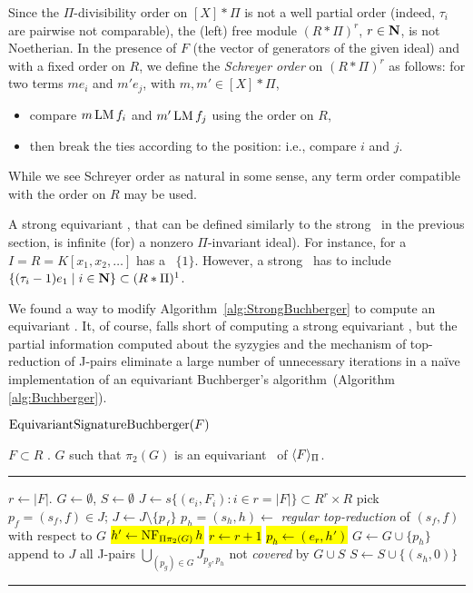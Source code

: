 Since the $\Pi$-divisibility order on $[X]*\Pi$ is not a well partial order (indeed, $\tau_i$ are pairwise not comparable), the (left) free module $(R*\Pi)^r$, $r\in\mathbf N$, is not Noetherian.  
In the presence of $F$ (the vector of generators of the given ideal) and with a fixed order on $R$, we define the \emph{Schreyer order} on $(R*\Pi)^r$ as follows: for two terms $me_i$ and $m'e_j$, with $m,m'\in [X]*\Pi$,
\begin{itemize}
\item compare $m\operatorname{LM} f_i$ and $m'\operatorname{LM} f_j$ using the order on $R$,
\item then break the ties according to the position: i.e., compare $i$ and $j$.
\end{itemize}
While we see Schreyer order as natural in some sense, any term order compatible with the order on $R$ may be used. %

A strong equivariant \GB, that can be defined similarly to the strong \GB\ in the previous section, is infinite (for) a nonzero $\Pi$-invariant ideal). 
For instance, for a $I = R = K[x_1,x_2,\ldots]$ has a \GB\ $\{1\}$.
However, a strong \GB\ has to include $\{(\tau_i-1)e_1 \mid i\in\mathbf N \} \subset (R*\Pi)^1$. 

We found a way to modify Algorithm~\ref{alg:StrongBuchberger} to compute an equivariant \GB.  It, of course, falls short of computing a strong equivariant \GB, but the partial information computed about the syzygies and the mechanism of top-reduction of J-pairs eliminate a large number of unnecessary iterations in a na\"ive implementation of an equivariant Buchberger's algorithm~(Algorithm \ref{alg:Buchberger}).

\begin{algorithm}\label{alg:egb-signature}
$\operatorname{EquivariantSignatureBuchberger}(F)$

\begin{algorithmic}[1]
\REQUIRE $F\subset R$ .
\ENSURE $G$ such that $\pi_2(G)$ is an equivariant \GB\ of $\langle F \rangle_\Pi$.
\smallskip \hrule \smallskip
\STATE $r\gets |F|$.
\STATE $G\gets \emptyset$, $S\gets \emptyset$ 
\STATE $J\gets s\{(e_i,F_i):i\in r=|F|\} \subset R^r\times R$ 
	\STATE pick $p_f = (s_f,f) \in J$; $J\gets J\setminus\{p_f\}$
	\STATE $p_h=(s_h,h) \gets$ {\em regular top-reduction} of $(s_f,f)$ with respect to $G$
		\STATE \hl{$h' \gets\operatorname{NF}_{\Pi\pi_2(G)} h$}
				\STATE \hl{$r\gets r+1$}
				\STATE \hl{$p_h \gets (e_r,h')$}
			\ENDIF
			\STATE $G\gets G\cup \{p_h\}$
			\STATE append to $J$ all J-pairs $\bigcup_{(p_g)\in G}J_{p_g,p_h}$ not {\em covered} by $G \cup S$ 
		\ENDIF
        \ELSE 
                \STATE $S\gets S\cup\{(s_h,0)\}$
	\ENDIF
\ENDWHILE
\smallskip \hrule \smallskip
\end{algorithmic}
\end{algorithm}

